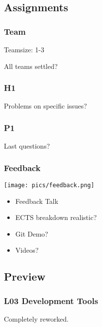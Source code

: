 \subsection{Assignments}

\begin{assignment}
	\frametitle{Team}
	Teamsize: 1-3

	\begin{task}
	All teams settled?
	\end{task}
\end{assignment}

\begin{assignment}
	\frametitle{H1}

	\begin{task}
	Problems on specific issues?
	\end{task}
\end{assignment}

\begin{assignment}
	\frametitle{P1}

	\begin{task}
	Last questions?
	\end{task}
\end{assignment}

\begin{frame}
	\frametitle{Feedback}

	\hfill \texttt{[image: pics/feedback.png]}
	\vspace{-1cm}
	\begin{itemize}
		\item Feedback Talk
		\item ECTS breakdown realistic?
		\item Git Demo?
		\item Videos?
	\end{itemize}
\end{frame}

\subsection{Preview}

\begin{frame}
	\frametitle{L03 Development Tools}

	Completely reworked.
\end{frame}



\nocite{raab2017introducing}

\appendix

\begin{frame}[allowframebreaks]
	
	
\end{frame}




